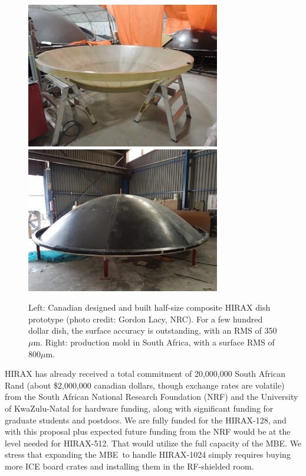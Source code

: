 \documentclass[letterpaper,11pt,preprint]{aastex}
\newcommand{\mbe}{{\rm MBE}}
\begin{document}
\begin{figure}[tbh]
  \includegraphics[height=2.5in]{3m_dish.jpg}
  \includegraphics[height=2.5in]{mms_mold.jpg}
\caption{\small Left:  Canadian designed and built half-size composite
  HIRAX dish prototype (photo credit: Gordon Lacy, NRC).  For a few
  hundred dollar dish, the surface accuracy is outstanding, with an
  RMS of 350$\mu$m.  Right: production mold in South Africa, with a
  surface RMS of 800$\mu$m.
  \label{fig:hirax_dishes}
}
\end{figure}


HIRAX has already received a total commitment of 20,000,000 South
African Rand (about \$2,000,000 canadian dollars, though exchange
rates are volatile) from the South African National Research
Foundation (NRF) and the University of KwaZulu-Natal for hardware
funding, along with significant funding for graduate students and
postdocs.  We are fully funded for the HIRAX-128, and with this
proposal plus expected future funding from the NRF would be at the
level needed for HIRAX-512.  That would utilize the full capacity of
the \mbe.  We stress that expanding the \mbe\ to handle HIRAX-1024
simply requires buying more ICE board crates and installing them in
the RF-shielded room.
\end{document}
